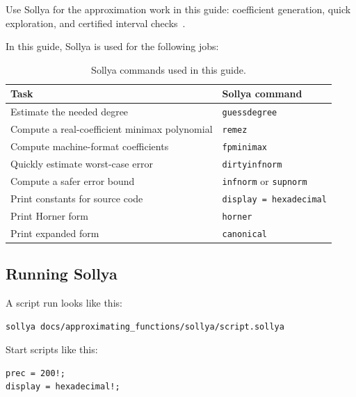 \documentclass[manuscript, nonacm]{acmart}
\begin{document}
    Use Sollya for the approximation work in this guide: coefficient generation,
    quick exploration, and certified interval checks~\cite{sollyapaper}.

    In this guide, Sollya is used for the following jobs:

    \begin{table}[H]
        \centering
        \caption{Sollya commands used in this guide.}
        \begin{tabular}{ll}
            \toprule
            Task                                          & Sollya command                       \\
            \midrule
            Estimate the needed degree                    & \texttt{guessdegree}                 \\
            Compute a real-coefficient minimax polynomial & \texttt{remez}                       \\
            Compute machine-format coefficients           & \texttt{fpminimax}                   \\
            Quickly estimate worst-case error             & \texttt{dirtyinfnorm}                \\
            Compute a safer error bound                   & \texttt{infnorm} or \texttt{supnorm} \\
            Print constants for source code               & \texttt{display = hexadecimal}       \\
            Print Horner form                             & \texttt{horner}                      \\
            Print expanded form                           & \texttt{canonical}                   \\
            \bottomrule
        \end{tabular}
    \end{table}

    \subsection{Running Sollya}

    A script run looks like this:
    \begin{lstlisting}[style=shell]
sollya docs/approximating_functions/sollya/script.sollya
    \end{lstlisting}

    Start scripts like this:
    \begin{lstlisting}[style=sollya]
prec = 200!;
display = hexadecimal!;
    \end{lstlisting}
\end{document}
